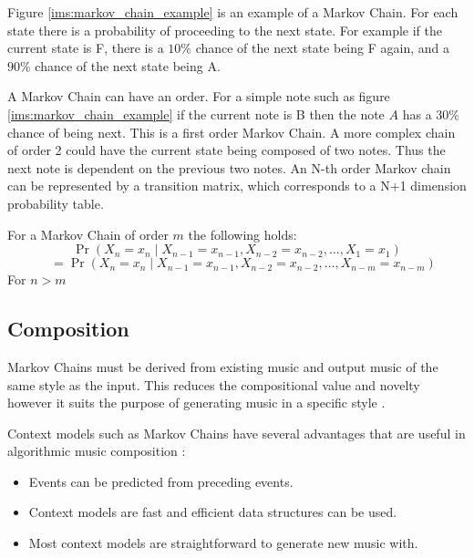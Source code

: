 Figure \ref{ims:markov_chain_example} is an example of a Markov Chain. For each state there is a probability of proceeding to the next state. For example if the current state is F, there is a $10\%$ chance of the next state being F again, and a $90\%$ chance of the next state being A.

A Markov Chain can have an order. For a simple note such as figure \ref{ims:markov_chain_example} if the current note is B then the note $A$ has a $30\%$ chance of being next. This is a first order Markov Chain.  A more complex chain of order 2 could have the current state being composed of two notes. Thus the next note is dependent on the previous two notes. An N-th order Markov chain can be represented by a transition matrix, which corresponds to a N+1 dimension probability table.

For a Markov Chain of order $m$ the following holds:
\[
\Pr(X_n=x_n\mid X_{n-1}=x_{n-1}, X_{n-2}=x_{n-2}, \dots , X_1=x_1)
\]
\[\quad = \Pr(X_n=x_n\mid X_{n-1}=x_{n-1}, X_{n-2}=x_{n-2}, \dots, X_{n-m}=x_{n-m})
\]
For $n > m$

\subsection{Composition}
Markov Chains must be derived from existing music and output music of the same style as the input. This reduces the compositional value and novelty however it suits the purpose of generating music in a specific style \cite{Jarvelainen2000}.

Context models such as Markov Chains have several advantages that are useful in algorithmic music composition \cite{Conklin2003}:
\begin{itemize}
\item Events can be predicted from preceding events.
\item Context models are fast and efficient data structures can be used.
\item Most context models are straightforward to generate new music with.
\end{itemize}


